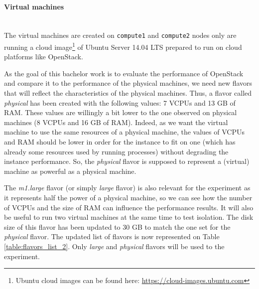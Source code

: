 \paragraph{Virtual machines}\mbox{}\\
The virtual machines are created on \texttt{compute1} and \texttt{compute2} nodes only are running a cloud image\footnote{Ubuntu cloud images can be found here: \url{https://cloud-images.ubuntu.com}} of Ubuntu Server 14.04 LTS prepared to run on cloud platforms like OpenStack. 

As the goal of this bachelor work is to evaluate the performance of OpenStack and compare it to the performance of the physical machines, we need new flavors that will reflect the characteristics of the physical machines.
Thus, a flavor called \textit{physical} has been created with the following values: 7 VCPUs and 13 GB of RAM.
These values are willingly a bit lower to the one observed on physical machines (8 VCPUs and 16 GB of RAM).
Indeed, as we want the virtual machine to use the same resources of a physical machine, the values of VCPUs and RAM should be lower in order for the instance to fit on one (which has already some resources used by running processes) without degrading the instance performance.
So, the \textit{physical} flavor is supposed to represent a (virtual) machine as powerful as a physical machine.

The \textit{m1.large} flavor (or simply \textit{large} flavor) is also relevant for the experiment as it represents half the power of a physical machine, so we can see how the number of VCPUs and the size of RAM can influence the performance results. 
It will also be useful to run two virtual machines at the same time to test isolation.
The disk size of this flavor has been updated to 30 GB to match the one set for the \textit{physical} flavor. 
The updated list of flavors is now represented on Table \ref{table:flavors_list_2}. 
Only \textit{large} and \textit{physical} flavors will be used to the experiment.

